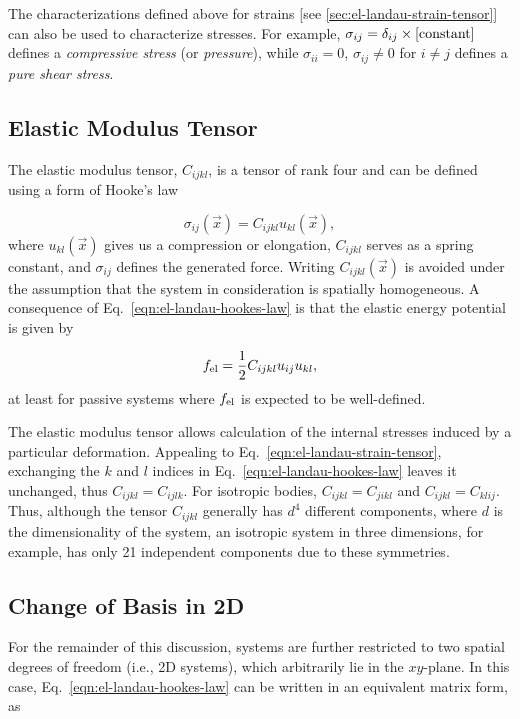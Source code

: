 The characterizations defined above for strains [see \ref{sec:el-landau-strain-tensor}] can also be used to characterize stresses.  For example, $\sigma_{ij} = \delta_{ij} \times \text{[constant]}$
defines a \textit{compressive stress} (or \textit{pressure}), while $\sigma_{ii} = 0$, $\sigma_{ij} \ne 0$ for $i \ne j$ defines a \textit{pure shear stress}.

\subsection*{Elastic Modulus Tensor}

The elastic modulus tensor, $C_{ijkl}$, is a tensor of rank four and can be defined using a form of Hooke's law

\begin{equation}\label{eqn:el-landau-hookes-law}
\sigma_{ij}(\vec{x}) = C_{ijkl} u_{kl}(\vec{x}),
\end{equation}
%
where $u_{kl}(\vec{x})$ gives us a compression or elongation, $C_{ijkl}$ serves as a spring constant, and $\sigma_{ij}$ defines the generated force.  Writing $C_{ijkl}(\vec{x})$ is avoided under the assumption that the system in consideration is spatially homogeneous.  A consequence of Eq.~\ref{eqn:el-landau-hookes-law} is that the elastic energy potential is given by

\begin{equation}
f_{\text{el}} = \frac{1}{2} C_{ijkl} u_{ij} u_{kl},
\end{equation}
%
at least for passive systems where $f_{\text{el}}$ is expected to be well-defined.

The elastic modulus tensor allows calculation of the internal stresses induced by a particular deformation.  Appealing to Eq.~\ref{eqn:el-landau-strain-tensor}, exchanging the $k$ and $l$ indices in Eq.~\ref{eqn:el-landau-hookes-law} leaves it unchanged, thus $C_{ijkl} = C_{ijlk}$.  For isotropic bodies, $C_{ijkl} = C_{jikl}$ and $C_{ijkl} = C_{klij}$.  Thus, although the tensor $C_{ijkl}$ generally has $d^4$ different components, where $d$ is the dimensionality of the system, an isotropic system in three dimensions, for example, has only 21 independent components due to these symmetries.

\subsection{Change of Basis in 2D}\label{sec:el-landau-change-of-basis}

For the remainder of this discussion, systems are further restricted to two spatial degrees of freedom (i.e., 2D systems), which arbitrarily lie in the $xy$-plane.  In this case, Eq.~\ref{eqn:el-landau-hookes-law} can be written in an equivalent matrix form, as

